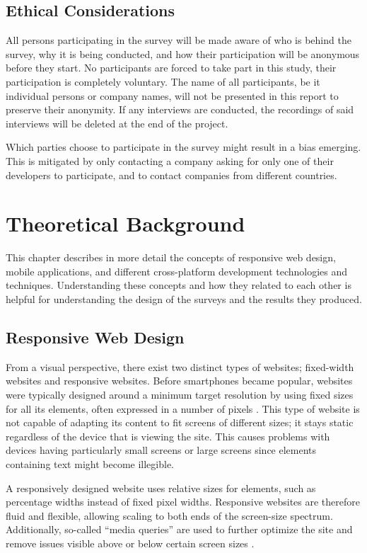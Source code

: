 \documentclass[a4paper,12pt]{article}
\begin{document}
\subsection{Ethical Considerations}
\label{Method_ethics}
All persons participating in the survey will be made aware of who is behind the survey, why it is being conducted, and how their participation will be anonymous before they start. No participants are forced to take part in this study, their participation is completely voluntary.
The name of all participants, be it individual persons or company names, will not be presented in this report to preserve their anonymity. If any interviews are conducted, the recordings of said interviews will be deleted at the end of the project.

Which parties choose to participate in the survey might result in a bias emerging. This is mitigated by only contacting a company asking for only one of their developers to participate, and to contact companies from different countries.
\newpage

\section{Theoretical Background}
\label{Theory}
This chapter describes in more detail the concepts of responsive web design, mobile applications, and different cross-platform development technologies and techniques. Understanding these concepts and how they related to each other is helpful for understanding the design of the surveys and the results they produced.

\subsection{Responsive Web Design}
\label{Theory_responsiveWeb}
From a visual perspective, there exist two distinct types of websites; fixed-width websites and responsive websites. Before smartphones became popular, websites were typically designed around a minimum target resolution by using fixed sizes for all its elements, often expressed in a number of pixels \cite{resp_web_2011}. This type of website is not capable of adapting its content to fit screens of different sizes; it stays static regardless of the device that is viewing the site. This causes problems with devices having particularly small screens or large screens since elements containing text might become illegible.

A responsively designed website uses relative sizes for elements, such as percentage widths instead of fixed pixel widths. Responsive websites are therefore fluid and flexible, allowing scaling to both ends of the screen-size spectrum. Additionally, so-called “media queries” are used to further optimize the site and remove issues visible above or below certain screen sizes \cite{resp_web_2011}.
\end{document}
